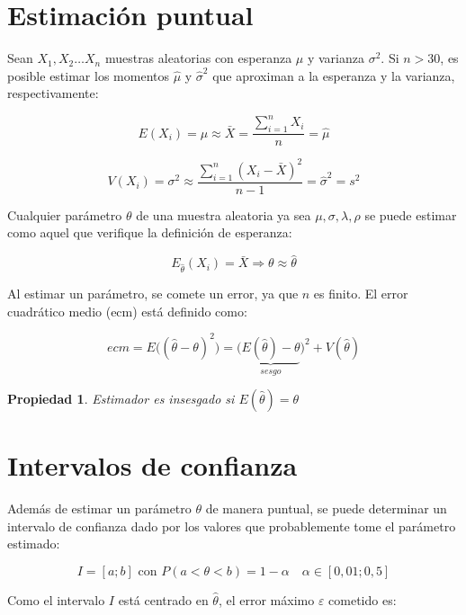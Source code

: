 \documentclass[a5paper,12pt,twoside]{book}
\newtheorem{prop}{{Propiedad}}[chapter]
\begin{document}
\section{Estimación puntual}

Sean $X_1,X_2 \dots X_n$ muestras aleatorias con esperanza $\mu$ y varianza $\sigma^2$. Si $n>30$, es posible estimar los momentos $\hat{\mu}$ y $\hat{\sigma}^2$ que aproximan a la esperanza y la varianza, respectivamente:

\begin{equation}
E(X_i) = \mu \approx \bar{X} = \dfrac{\sum_{i=1}^n X_i}{n}=\hat{\mu}
\end{equation}

\begin{equation}
V(X_i) = \sigma^2 \approx \dfrac{\sum_{i=1}^n (X_i-\bar{X})^2}{n-1}=\hat{\sigma}^2=s^2
\end{equation}

Cualquier parámetro $\theta$ de una muestra aleatoria ya sea $\mu, \sigma, \lambda, \rho$ se puede estimar como aquel que verifique la definición de esperanza:

\begin{equation}
E_{\hat{\theta}} (X_i)=\bar{X} \Rightarrow \theta \approx \hat{\theta}
\end{equation}

Al estimar un parámetro, se comete un error, ya que $n$ es finito. El error cuadrático medio (ecm) está definido como:

$$ ecm = E\big( (\hat{\theta}-\theta)^2 \big) = \big( \underbrace{E(\hat{\theta})-\theta}_{sesgo} \big)^2+V(\hat{\theta}) $$

\begin{prop}
Estimador es insesgado si $E(\hat{\theta})=\theta$
\end{prop}

\section{Intervalos de confianza}

Además de estimar un parámetro $\theta$ de manera puntual, se puede determinar un intervalo de confianza dado por los valores que probablemente tome el parámetro estimado:

$$ I=[a;b] \text{ con } P(a<\theta<b)=1-\alpha \quad \alpha \in [0,01 ; 0,5] $$

Como el intervalo $I$ está centrado en $\hat{\theta}$, el error máximo $\varepsilon$ cometido es:
\end{document}
